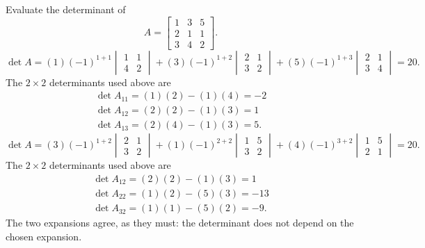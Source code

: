 \goal Evaluate the determinant of
\[A=\begin{bmatrix}1&3&5\\2&1&1\\3&4&2\end{bmatrix}.\]
\[
\det A=(1)(-1)^{1+1}\begin{vmatrix}1&1\\4&2\end{vmatrix} + (3)(-1)^{1+2}\begin{vmatrix}2&1\\3&2\end{vmatrix} + (5)(-1)^{1+3}\begin{vmatrix}2&1\\3&4\end{vmatrix}=20.
\]
The $2\times2$ determinants used above are
\[
\begin{gathered}\det A_{11}=(1)(2)-(1)(4)=-2\\\det A_{12}=(2)(2)-(1)(3)=1\\\det A_{13}=(2)(4)-(1)(3)=5.\end{gathered}
\]
\[
\det A=(3)(-1)^{1+2}\begin{vmatrix}2&1\\3&2\end{vmatrix} + (1)(-1)^{2+2}\begin{vmatrix}1&5\\3&2\end{vmatrix} + (4)(-1)^{3+2}\begin{vmatrix}1&5\\2&1\end{vmatrix}=20.
\]
The $2\times2$ determinants used above are
\[
\begin{gathered}\det A_{12}=(2)(2)-(1)(3)=1\\\det A_{22}=(1)(2)-(5)(3)=-13\\\det A_{32}=(1)(1)-(5)(2)=-9.\end{gathered}
\]
The two expansions agree, as they must: the determinant does not depend on the chosen expansion.

